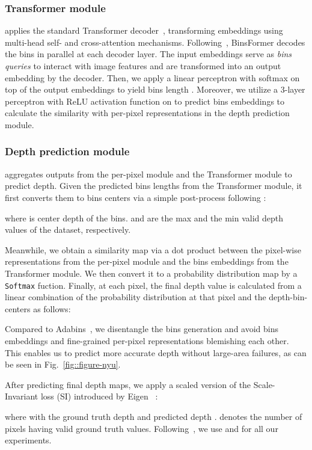\documentclass[runningheads]{llncs}
\begin{document}
\subsubsection{Transformer module} applies the standard Transformer decoder~\cite{dosovitskiy2020vit}, transforming  embeddings using multi-head self- and cross-attention mechanisms. Following~\cite{carion2020detr}, BinsFormer decodes the  bins in parallel at each decoder layer. The  input embeddings serve as \textit{bins queries} to interact with image features  and are transformed into an output embedding  by the decoder. Then, we apply a linear perceptron with softmax on top of the output embeddings  to yield  bins length . Moreover, we utilize a 3-layer perceptron with ReLU activation function on  to predict  bins embeddings  to calculate the similarity with per-pixel representations  in the depth prediction module.

\subsubsection{Depth prediction module} aggregates outputs from the per-pixel module and the Transformer module to predict depth. Given the predicted bins lengths  from the Transformer module, it first converts them to bins centers via a simple post-process following \cite{bhat2021adabins}:

\noindent where  is center depth of the  bins.  and  are the max and the min valid depth values of the dataset, respectively.

Meanwhile, we obtain a similarity map via a dot product between the pixel-wise representations  from the per-pixel module and the bins embeddings  from the Transformer module. We then convert it to a probability distribution map  by a \texttt{Softmax} fuction. Finally, at each pixel, the final depth value  is calculated from a linear combination of the probability distribution at that pixel and the depth-bin-centers  as follows:


Compared to Adabins~\cite{bhat2021adabins}, we disentangle the bins generation and avoid bins embeddings and fine-grained per-pixel representations blemishing each other. This enables us to predict more accurate depth without large-area failures, as can be seen in Fig.~\ref{fig::figure-nyu}.

After predicting final depth maps, we apply a scaled version of the Scale-Invariant loss (SI) introduced by Eigen \etal~\cite{eigen2014depth}:

\noindent where  with the ground truth depth  and predicted depth .  denotes the number of pixels having valid ground truth values. Following~\cite{bhat2021adabins}, we use  and  for all our experiments.
\end{document}
